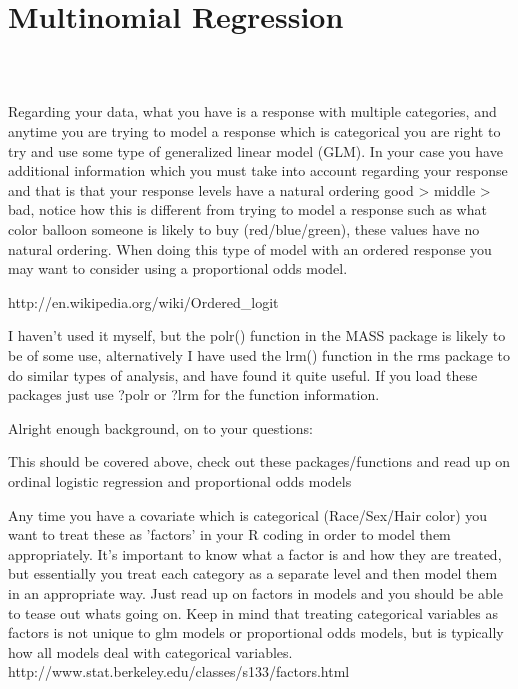 \documentclass[00-GLMregression.tex]{subfiles}
\begin{document}
	
\section{Multinomial Regression}

\begin{verbatim}



\end{verbatim}	
Regarding your data, what you have is a response with multiple categories, and anytime you are trying to model a response which is categorical you are right to try and use some type of generalized linear model (GLM). In your case you have additional information which you must take into account regarding your response and that is that your response levels have a natural ordering good > middle > bad, notice how this is different from trying to model a response such as what color balloon someone is likely to buy (red/blue/green), these values have no natural ordering. When doing this type of model with an ordered response you may want to consider using a proportional odds model.

http://en.wikipedia.org/wiki/Ordered_logit

I haven't used it myself, but the polr() function in the MASS package is likely to be of some use, alternatively I have used the lrm() function in the rms package to do similar types of analysis, and have found it quite useful. If you load these packages just use ?polr or ?lrm for the function information.

Alright enough background, on to your questions:

This should be covered above, check out these packages/functions and read up on ordinal logistic regression and proportional odds models

Any time you have a covariate which is categorical (Race/Sex/Hair color) you want to treat these as 'factors' in your R coding in order to model them appropriately. It's important to know what a factor is and how they are treated, but essentially you treat each category as a separate level and then model them in an appropriate way. Just read up on factors in models and you should be able to tease out whats going on. Keep in mind that treating categorical variables as factors is not unique to glm models or proportional odds models, but is typically how all models deal with categorical variables. http://www.stat.berkeley.edu/classes/s133/factors.html
\end{document}
